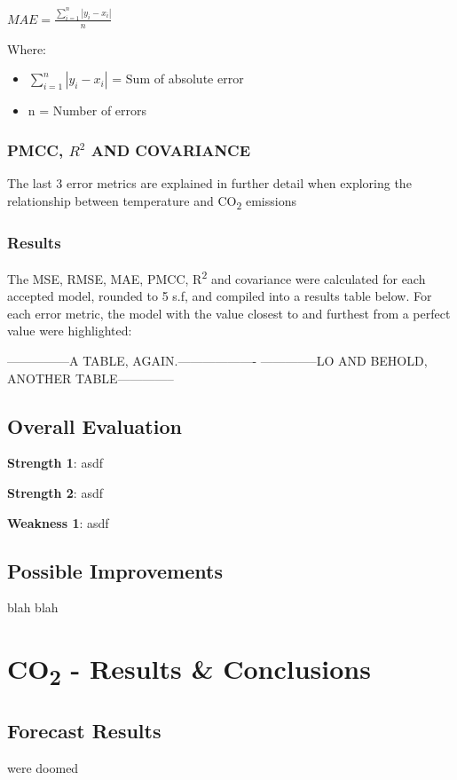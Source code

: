 \documentclass[12pt]{mcmthesis}
\begin{document}
    ${\displaystyle {MAE} ={\frac {\sum _{i=1}^{n}\left|y_{i}-x_{i}\right|}{n}}}$

    Where:
    \begin{itemize}
        \item ${\sum _{i=1}^{n}\left|y_{i}-x_{i}\right|}$ = Sum of absolute error
        \item {n} = Number of errors
    \end{itemize}

    \subsubsection*{PMCC, ${R^2}$ AND COVARIANCE}
    The last 3 error metrics are explained in further detail when exploring the relationship between temperature and CO\textsubscript{2} emissions

    \subsubsection*{Results}
    The MSE, RMSE, MAE, PMCC, R\textsuperscript{2} and covariance were calculated for each accepted model, rounded to 5 s.f, and compiled into a results table below. For each error metric, the model with the value closest to and furthest from a perfect value were highlighted:

    ---------------A TABLE, AGAIN.-------------------
    --------------LO AND BEHOLD, ANOTHER TABLE--------------

    \subsection{Overall Evaluation}

    \noindent\textbf{Strength 1}: asdf

    \noindent\textbf{Strength 2}: asdf

    \noindent\textbf{Weakness 1}: asdf

    \subsection{Possible Improvements}
    blah blah

    \newpage


    \section{CO\textsubscript{2} - Results \& Conclusions}

    \subsection{Forecast Results}
    we\textquotesingle re doomed
\end{document}
